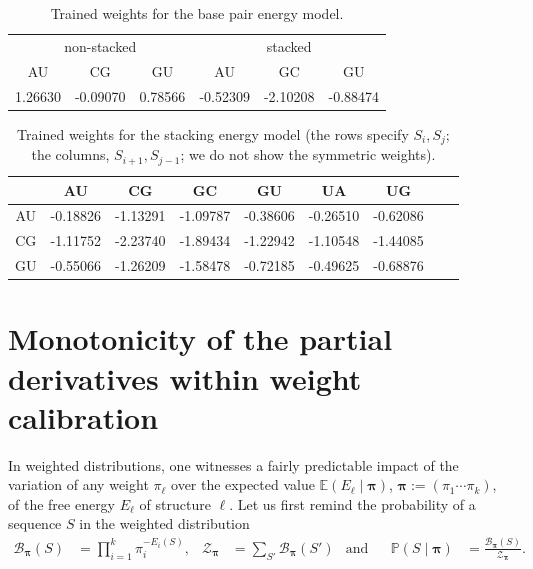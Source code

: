 \documentclass{bioinfo}
\newcommand{\partfun}[1]{\mathcal{Z}_{#1}}
\begin{document}
\begin{table}
  \centering
  \caption{Trained weights for the base pair energy model.} 
  \label{tab:basepairmodel}
  \begin{tabular}{c@{\quad}c@{\quad}c@{\quad}|@{\quad}c@{\quad}c@{\quad}c}
    \multicolumn{3}{c}{non-stacked} & \multicolumn{3}{c}{stacked}\\ 
    AU      & CG       & GU      & AU       & GC       & GU \\\hline
    1.26630 & -0.09070 & 0.78566 & -0.52309 & -2.10208 & -0.88474
  \end{tabular}
\end{table}


\begin{table}
  \centering
  \caption{Trained weights for the stacking energy model (the rows specify $S_i,S_j$; the columns, $S_{i+1},S_{j-1}$; we do not show the symmetric weights).}
  \label{tab:stackingmodel}
  \begin{tabular}{c@{\quad}|@{\quad}c@{\quad}c@{\quad}c@{\quad}c@{\quad}c@{\quad}c@{\quad}c@{\quad}c}
       & AU & CG & GC & GU & UA & UG \\\hline
    AU &
-0.18826 &
-1.13291 &
-1.09787 &
-0.38606 &
-0.26510 &
-0.62086
    \\
    CG &
-1.11752 &
-2.23740 &
-1.89434 &
-1.22942 &
-1.10548 &
-1.44085
    \\
    GU &
-0.55066 &
-1.26209 &
-1.58478 &
-0.72185 &
-0.49625 &
-0.68876
    \\
  \end{tabular}
\end{table}

\section{Monotonicity of the partial derivatives within weight calibration}
\label{sec:weight_derivatives}
%
In weighted distributions, one witnesses a fairly predictable impact of the variation of any weight $\pi_\ell$ over the expected value $\mathbb{E}(E_\ell\mid \pmb{\pi})$, $\pmb{\pi}:= (\pi_1\cdots\pi_k)$, of the free energy $E_\ell$ of structure $\ell$.  Let us  first remind the probability of a sequence $S$ in the weighted distribution
\begin{align*} 
  \mathcal{B}_{\pmb{\pi}}(S) &= \prod_{i=1}^{k} \pi_i^{-E_i(S)}, &
  \partfun{\pmb{\pi}}&=\sum_{S'}\mathcal{B}_{\pmb{\pi}}(S') &
    \text{and}& &
  \mathbb{P}(S\mid \pmb{\pi}) &= \frac{\mathcal{B}_{\pmb{\pi}}(S)}{\partfun{\pmb{\pi}}}.
  \end{align*}
  
\end{document}
